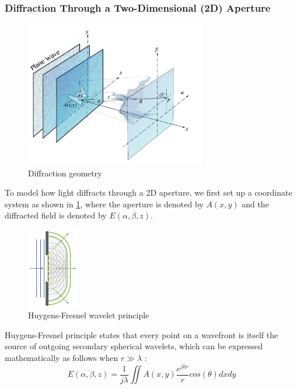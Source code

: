 \subsubsection{Diffraction Through a Two-Dimensional (2D) Aperture}
\begin{figure}[H]
  \centering
  \includegraphics[width=0.7\textwidth]{diffraction_coordinate_definition.jpg}
  \caption{Diffraction geometry}\label{fig:diffraction_coordinate_definition}
\end{figure}

To model how light diffracts through a 2D aperture, we first set up a coordinate system as shown in \cref{fig:diffraction_coordinate_definition}, where the aperture is denoted by $A(x, y)$ and the diffracted field is denoted by $E(\alpha, \beta, z)$.

\begin{figure}[H]
  \centering
  \includegraphics[width=0.2\textwidth]{huygens_wavelets_principle.png}
  \caption{Huygens-Fresnel wavelet principle \cite{Nordmann2007}}\label{fig:huygens_wavelets_principle}
\end{figure}

Huygens-Fresnel principle states that every point on a wavefront is itself the source of outgoing secondary spherical wavelets, which can be expressed mathematically as follows when $r\gg \lambda$ \cite{Goodman2017}:
\begin{equation}
  E(\alpha, \beta, z) = \frac{1}{j\lambda} \iint A(x,y)\frac{e^{jkr}}{r} cos(\theta) dxdy \label{eq:huygens-fresnel-principle}
\end{equation}

